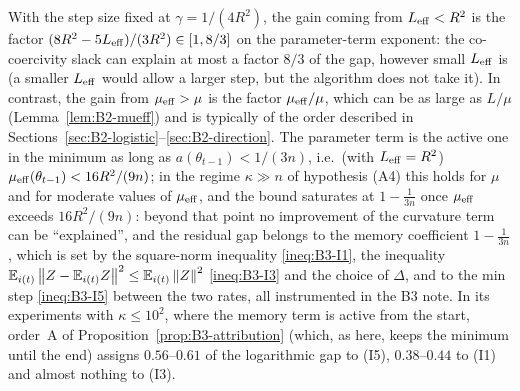 \begin{remark}\label{rem:B2-what-explains}
With the step size fixed at $\gamma=1/(4R^2)$, the gain coming from $L_{\mathrm{eff}}<R^2$ is the factor
$(8R^2-5L_{\mathrm{eff}})/(3R^2)\in[1,8/3]$ on the parameter-term exponent: the co-coercivity slack can explain at most a
factor $8/3$ of the gap, however small $L_{\mathrm{eff}}$ is (a smaller $L_{\mathrm{eff}}$ would allow a larger step, but the
algorithm does not take it). In contrast, the gain from $\mu_{\mathrm{eff}}>\mu$ is the factor $\mu_{\mathrm{eff}}/\mu$, which can be as
large as $L/\mu$ (Lemma~\ref{lem:B2-mueff}) and is typically of the order described in
Sections~\ref{sec:B2-logistic}--\ref{sec:B2-direction}. The parameter term is the active one in the minimum as
long as $a(\theta_{t-1})<1/(3n)$, i.e.\ (with $L_{\mathrm{eff}}=R^2$) $\mu_{\mathrm{eff}}(\theta_{t-1})<16R^2/(9n)$; in the regime
$\kappa\gg n$ of hypothesis (A4) this holds for $\mu$ and for moderate values of $\mu_{\mathrm{eff}}$, and the bound saturates
at $1-\frac1{3n}$ once $\mu_{\mathrm{eff}}$ exceeds $16R^2/(9n)$: beyond that point no improvement of the curvature term can be
``explained'', and the residual gap belongs to the memory coefficient $1-\frac1{3n}$, which is set by the square-norm
inequality \eqref{ineq:B3-I1}, the inequality $\mathbb{E}_{i(t)}\left\|Z-\mathbb{E}_{i(t)} Z\right\|^2\le\mathbb{E}_{i(t)}\left\|Z\right\|^2$ \eqref{ineq:B3-I3} and the choice of
$\Delta$, and to the min step \eqref{ineq:B3-I5} between the two rates, all instrumented in the B3 note. In its
experiments with $\kappa\le10^2$, where the memory term is active from the start, order~A of
Proposition~\ref{prop:B3-attribution} (which, as here, keeps the minimum until the end) assigns $0.56$--$0.61$ of the
logarithmic gap to (I5), $0.38$--$0.44$ to (I1) and almost nothing to (I3).
\end{remark}

